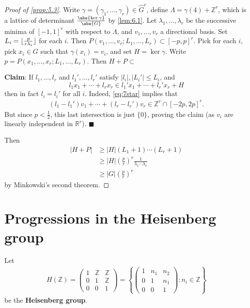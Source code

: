 \documentclass{article}
\newcommand{\named}[1]{\textbf{#1}\index{#1}}
\newcommand{\ratio}[2]{\frac{\abs{#1}}{\abs{#2}}}
\DeclarePairedDelimiter\floor{\lfloor}{\rfloor}
\numberwithin{equation}{section}
\begin{document}
\begin{proof}[Proof of \cref{prop:5.3}]
\newlec
  Write $\gamma = (\gamma_1, \dotsc, \gamma_r) \in \hat{G}^r$, define $\Lambda = \gamma(4) + \mathbb{Z}^r$, which is a lattice of determinant $\ratio{\ker \gamma}{G}$ by \cref{lem:6.1}.
  Let $\lambda_1, \dotsc, \lambda_r$ be the successive minima of $[-1,1]^r$ with respect to $\Lambda$, and $v_1, \dotsc, v_r$ a directional basis. Set $L_i = \floor{\frac{p}{r \lambda_i}}$ for each $i$.
  Then $P(v_1, \dotsc, v_r; L_1, \dotsc, L_r) \subset [-p,p]^r$. Pick for each $i$, pick $x_i \in G$ such that $\gamma(x_i) = v_i$, and set $H = \ker \gamma$.
  Write $p = P(x_1, \dotsc, x_r; L_1, \dotsc, L_r)$. Then $H+P \subset $

  \textbf{Claim}: If $l_1, \dotsc, l_r$ and $l_1', \dotsc, l_r'$ satisfy $|l_i|, |L_i'| \leq L_i$, and
  \begin{equation}
    l_1 x_1 + \dotsb + l_r x_r \in l_1' x_1 + \dotsb + l_r' x_r + H \label{eq:7star} \tag{$*$}
  \end{equation}
  then in fact $l_i = l_i'$ for all $i$.
  Indeed, \eqref{eq:7star} implies that
  \begin{align*}
    (l_1 - l_1') v_1 + \dotsb + (l_r - l_r') v_r \in \mathbb{Z}^r \cap [-2p,2p]^r.
  \end{align*}
  But since $p < \frac{1}{2}$, this last intersection is just $\{0\}$, proving the claim (as $v_i$ are linearly independent in $\mathbb{R}^r$). $\blacksquare$

  Then
  \begin{align*}
    |H+P| &\geq |H|(L_1 +1)\dotsm(L_r+1) \\
          &\geq |H| \left(\frac{p}{r}\right)^r \frac{1}{\lambda_1 \dotsm \lambda_r} \\
          &\geq |G| \left(\frac{p}{r}\right)^r
  \end{align*}
  by Minkowski's second theorem.
\end{proof}

\clearpage
\section{Progressions in the Heisenberg group}
Let
\begin{align*}
  H(\mathbb{Z}) =
  \begin{pmatrix}
    1 & \mathbb{Z} & \mathbb{Z} \\ 0 & 1 & \mathbb{Z} \\ 0 & 0 & 1
  \end{pmatrix} =
  \left\{
    \begin{pmatrix}
      1 & n_1 & n_2 \\ 0 & 1 & n_1 \\ 0 & 0 & 1
    \end{pmatrix}
    : n_i \in \mathbb{Z}
  \right\}
\end{align*}
be the \named{Heisenberg group}.
\end{document}
